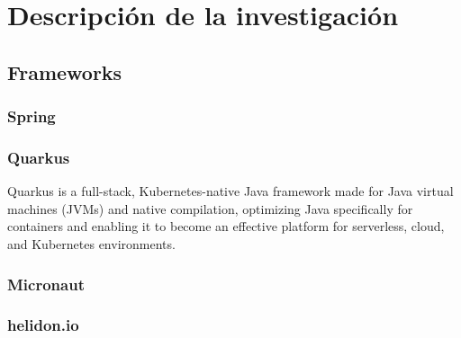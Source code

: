 \chapter{Descripción de la investigación}


\section{Frameworks}

\subsection{Spring}

\subsection{Quarkus}
Quarkus is a full-stack, Kubernetes-native Java framework made for Java virtual machines (JVMs) and native compilation, optimizing Java specifically for containers and enabling it to become an effective platform for serverless, cloud, and Kubernetes environments.
\cite{WhatisQu51:online}

\subsection{Micronaut}



\subsection{helidon.io}

